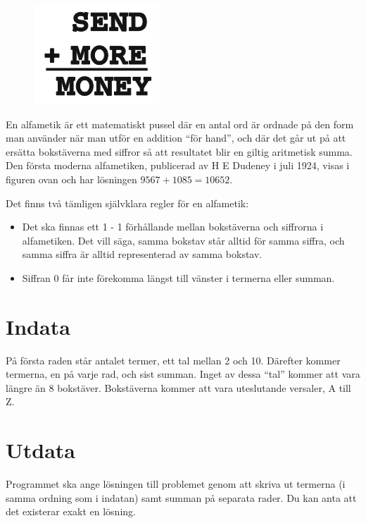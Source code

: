 
\begin{figure}
   \centering
	\includegraphics{alfametik}
\end{figure}

En alfametik är ett matematiskt pussel där en antal ord är ordnade på den form man använder när man utför en addition ``för hand'', och där det går ut på att ersätta bokstäverna med siffror så att resultatet blir en giltig aritmetisk summa. Den första moderna alfametiken, publicerad av H E Dudeney i juli 1924, visas i figuren ovan och har lösningen $9567 + 1085 = 10652$.

Det finns två tämligen självklara regler för en alfametik: 

\begin{itemize}

\item Det ska finnas ett 1 - 1 förhållande mellan bokstäverna och siffrorna i alfametiken. Det vill säga, samma bokstav står alltid för samma siffra, och samma siffra är alltid representerad av samma bokstav.

\item Siffran 0 får inte förekomma längst till vänster i termerna eller summan.

\end{itemize}

\section*{Indata}
På första raden står antalet termer, ett tal mellan 2 och 10. Därefter kommer termerna, en på varje rad, och sist summan. Inget av dessa ``tal'' kommer att vara längre än 8 bokstäver. Bokstäverna kommer att vara uteslutande versaler, A till Z. 

\section*{Utdata}
Programmet ska ange lösningen till problemet genom att skriva ut termerna (i samma ordning som i indatan) samt summan på separata rader. Du kan anta att det existerar exakt en lösning. 

